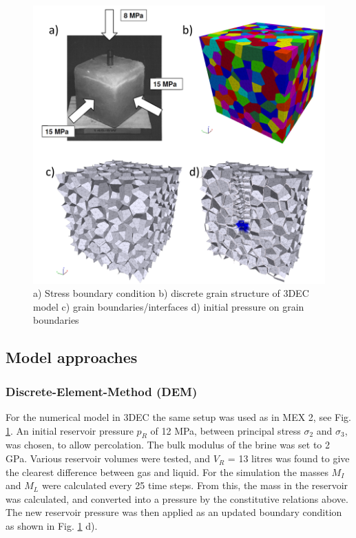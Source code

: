 \begin{figure}[!ht]
\centering
\includegraphics[width=1\textwidth]{figures/mex4-dem-setup.png}
\caption{a) Stress boundary condition b) discrete grain structure of 3DEC model c) grain boundaries/interfaces d) initial pressure on grain boundaries}
\label{fig:ME4-dem-setup}
\end{figure}

\subsection{Model approaches}
\subsubsection*{Discrete-Element-Method (DEM)}

For the numerical model in 3DEC the same setup was used as in MEX 2, see Fig. \ref{fig:ME4-dem-setup}. An initial reservoir pressure $p_R$ of 12 MPa, between principal stress $\sigma_2$ and $\sigma_3$, was chosen, to allow percolation. The bulk modulus of the brine was set to 2 GPa. Various reservoir volumes were tested, and  $V_R$ = 13 litres was found to give the clearest difference between gas and liquid.
For the simulation the masses $M_I$ and $M_L$ were calculated every 25 time steps. From this, the mass in the reservoir was calculated, and converted into a pressure by the constitutive relations above. The new reservoir pressure was then applied as an updated boundary condition as shown in Fig. \ref{fig:ME4-dem-setup} d). 

